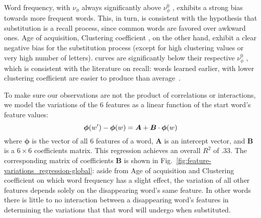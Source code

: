 Word frequency, with $\nu_{\phi}$ always significantly above $\nu_{\phi}^0$ , exhibits a strong bias towards more frequent words.
This, in turn, is consistent with the hypothesis that substitution is a recall process, since common words are favored over awkward ones.
Age of acquisition, Clustering coefficient , on the other hand, exhibit a clear negative bias for the substitution process (except for high clustering values or very high number of letters).
 curves are significantly below their respective $\nu_{\phi}^0$ , which is consistent with the literature on recall:
words learned earlier, with lower clustering coefficient  are easier to produce than average~\citep{nelson_how_2013,zevin_age_2002,baddeley_word_1975}.

\begin{new}

To make sure our observations are not the product of correlations or interactions, we model the variations of the 6 features as a linear function of the start word's feature values:
$$\bm{\phi}(\warrival) - \bm{\phi}(\wstart) = \bm{A} +  \bm{B} \cdot \bm{\phi}(\wstart)$$
where $\bm{\phi}$ is the vector of all 6 features of a word, $\bm{A}$ is an intercept vector, and $\bm{B}$ is a $6 \times 6$ coefficients matrix.
This regression achieves an overall $R^2$ of $.33$.
The corresponding matrix of coefficients $\bm{B}$ is shown in Fig.~\ref{fig:feature-variations_regression-global}:
aside from Age of acquisition and Clustering coefficient on which word frequency has a slight effect, the variation of all other features depends solely on the disappearing word's same feature.
In other words there is little to no interaction between a disappearing word's features in determining the variations that that word will undergo when substituted.

\end{new}

